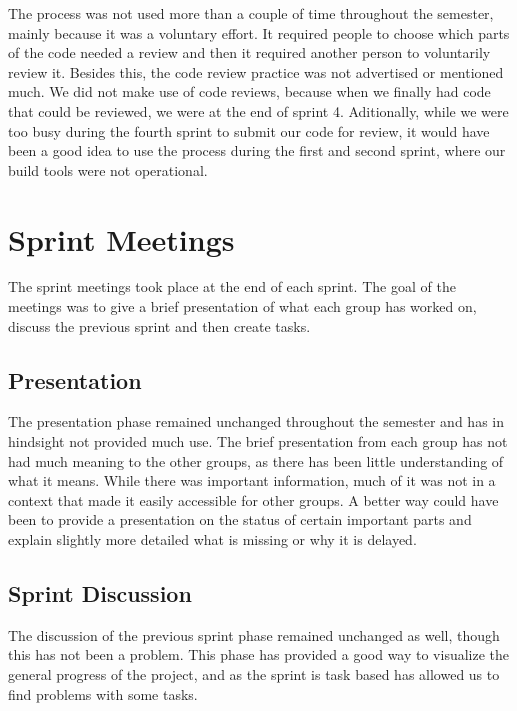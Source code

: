 The process was not used more than a couple of time throughout the semester,
mainly because it was a voluntary effort. It required people to choose
which parts of the code needed a review and then it required another
person to voluntarily review it. Besides this, the code review practice was not
advertised or mentioned much. We did not make use of code reviews, because
when we finally had code that could be reviewed, we were at the end of sprint 4.
Aditionally, while we were too busy during the fourth sprint to submit our code
for review, it would have been a good idea to use the process during the first
and second sprint, where our build tools were not operational.

\section{Sprint Meetings}
The sprint meetings took place at the end of each sprint. The goal of the
meetings was to give a brief presentation of what each group has worked on,
discuss the previous sprint and then create tasks.\nl

\subsection{Presentation}
The presentation phase remained unchanged throughout the semester and has in
hindsight not provided much use. The brief presentation from each group has not
had much meaning to the other groups, as there has been little understanding of
what it means. While there was important information, much of it was not in a
context that made it easily accessible for other groups. A better way could have
been to provide a presentation on the status of certain important parts and
explain slightly more detailed what is missing or why it is delayed.\nl

\subsection{Sprint Discussion}
The discussion of the previous sprint phase remained unchanged as well,
though this has not been a problem. This phase has provided a good way to
visualize the general progress of the project, and as the sprint is task based
has allowed us to find problems with some tasks.\nl

